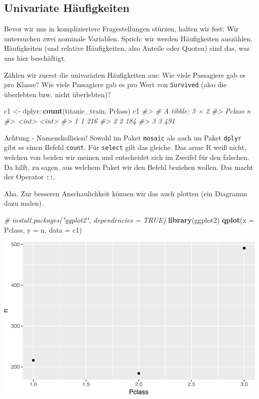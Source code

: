 \documentclass[12pt,]{book}
\newenvironment{Shaded}{\begin{snugshade}}{\end{snugshade}}
\newcommand{\KeywordTok}[1]{\textcolor[rgb]{0.13,0.29,0.53}{\textbf{{#1}}}}
\newcommand{\DataTypeTok}[1]{\textcolor[rgb]{0.13,0.29,0.53}{{#1}}}
\newcommand{\StringTok}[1]{\textcolor[rgb]{0.31,0.60,0.02}{{#1}}}
\newcommand{\CommentTok}[1]{\textcolor[rgb]{0.56,0.35,0.01}{\textit{{#1}}}}
\newcommand{\NormalTok}[1]{{#1}}
\let\BeginKnitrBlock\begin \let\EndKnitrBlock\end
\begin{document}
\subsection{Univariate Häufigkeiten}\label{univariate-haufigkeiten}

Bevor wir uns in kompliziertere Fragestellungen stürzen, halten wir
fest: Wir untersuchen zwei nominale Variablen. Sprich: wir werden
Häufigkeiten auszählen. Häufigkeiten (und relative Häufigkeiten, also
Anteile oder Quoten) sind das, was uns hier beschäftigt.

Zählen wir zuerst die univariaten Häufigkeiten aus: Wie viele Passagiere
gab es pro Klasse? Wie viele Passagiere gab es pro Wert von
\texttt{Survived} (also die überlebten bzw. nicht überlebten)?

\begin{Shaded}
\begin{Highlighting}[]
\NormalTok{c1 <-}\StringTok{ }\NormalTok{dplyr::}\KeywordTok{count}\NormalTok{(titanic_train, Pclass)}
\NormalTok{c1}
\CommentTok{#> # A tibble: 3 × 2}
\CommentTok{#>   Pclass     n}
\CommentTok{#>    <int> <int>}
\CommentTok{#> 1      1   216}
\CommentTok{#> 2      2   184}
\CommentTok{#> 3      3   491}
\end{Highlighting}
\end{Shaded}

\BeginKnitrBlock{rmdcaution}
Achtung - Namenskollision! Sowohl im Paket \texttt{mosaic} als auch im
Paket \texttt{dplyr} gibt es einen Befehl \texttt{count}. Für
\texttt{select} gilt das gleiche. Das arme R weiß nicht, welchen von
beiden wir meinen und entscheidet sich im Zweifel für den falschen. Da
hilft, zu sagen, aus welchem Paket wir den Befehl beziehen wollen. Das
macht der Operator \texttt{::}.
\EndKnitrBlock{rmdcaution}

Aha. Zur besseren Anschaulichkeit können wir das auch plotten (ein
Diagramm dazu malen).

\begin{Shaded}
\begin{Highlighting}[]
\CommentTok{# install.packages("ggplot2", dependencies = TRUE)}
\KeywordTok{library}\NormalTok{(ggplot2)}
\KeywordTok{qplot}\NormalTok{(}\DataTypeTok{x =} \NormalTok{Pclass, }\DataTypeTok{y =} \NormalTok{n, }\DataTypeTok{data =} \NormalTok{c1)}
\end{Highlighting}
\end{Shaded}

\begin{center}\includegraphics[width=0.7\linewidth]{075_Fallstudie_Titanic_files/figure-latex/plot-titanic1-1} \end{center}
\end{document}
